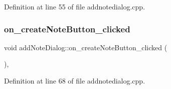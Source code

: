Definition at line 55 of file addnotedialog.\+cpp.

\hypertarget{classaddNoteDialog_a67b28dc05851888a45774eb240d6e43d}{}\label{classaddNoteDialog_a67b28dc05851888a45774eb240d6e43d} 
\subsubsection{\texorpdfstring{on\+\_\+create\+Note\+Button\+\_\+clicked}{on\_createNoteButton\_clicked}}
{\footnotesize\ttfamily void add\+Note\+Dialog\+::on\+\_\+create\+Note\+Button\+\_\+clicked (\begin{DoxyParamCaption}{ }\end{DoxyParamCaption})\hspace{0.3cm}{\ttfamily [private]}, {\ttfamily [slot]}}



Definition at line 68 of file addnotedialog.\+cpp.

